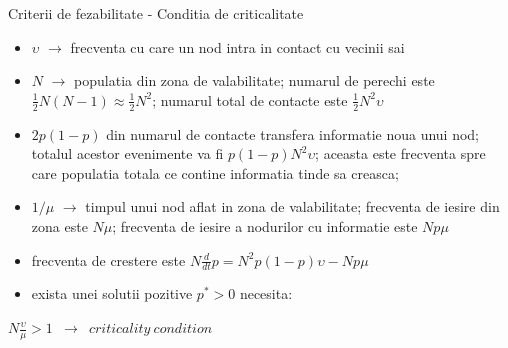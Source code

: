 \documentclass{beamer}
\begin{document}
\begin{frame}{Criterii de fezabilitate - Conditia de criticalitate}
	\begin{itemize}
	  \item $\upsilon$ $\rightarrow$ frecventa cu care un nod intra in contact cu
	  vecinii sai
	  \item $N$ $\rightarrow$ populatia din zona de valabilitate; numarul de
	  perechi este $\frac{1}{2}N(N-1) \approx \frac{1}{2}N^2$; numarul total de
	  contacte este $\frac{1}{2}N^2\upsilon$
	  \item $2p(1-p)$ din numarul de contacte transfera informatie noua unui nod;
	  totalul acestor evenimente va fi $p(1-p)N^2\upsilon$; aceasta este frecventa
	  spre care populatia totala ce contine informatia tinde sa creasca;  
	  \item $1/\mu$ $\rightarrow$ timpul unui nod aflat in zona de valabilitate;
	  frecventa de iesire din zona este $N\mu$; frecventa de iesire a nodurilor cu
	  informatie este $Np\mu$
	  \item frecventa de crestere este $N\frac{d}{dt}p = N^2p(1-p)\upsilon - Np\mu$
	  \item exista unei solutii pozitive $p^* > 0$ necesita:
	\end{itemize}
	\hskip0.5in
	\small{
		\begin{beamerboxesrounded}[lower=block body,shadow=true,width=3.2in]{}
			\begin{center}
				\texttt{$N\frac{\upsilon}{\mu} > 1$ $\rightarrow$ $criticality\ condition$}
			\end{center}
		\end{beamerboxesrounded}
	}
\end{frame}
\end{document}
